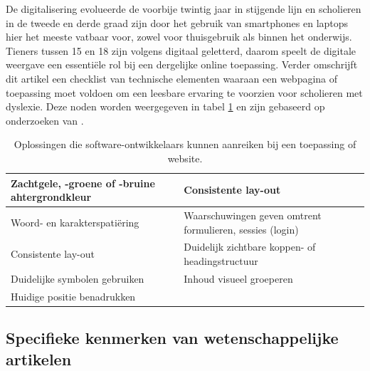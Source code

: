 \medspace


De digitalisering evolueerde de voorbije twintig jaar in stijgende lijn en scholieren in de tweede en derde graad zijn door het gebruik van smartphones en laptops hier het meeste vatbaar voor, zowel voor thuisgebruik als binnen het onderwijs. Tieners tussen 15 en 18 zijn volgens \textcite{Harvard2023} digitaal geletterd, daarom speelt de digitale weergave een essentiële rol bij een dergelijke online toepassing. Verder omschrijft dit artikel een checklist van technische elementen waaraan een webpagina of toepassing moet voldoen om een leesbare ervaring te voorzien voor scholieren met dyslexie. Deze noden worden weergegeven in tabel \ref{table:dyslexia-necessaries} en zijn gebaseerd op onderzoeken van \textcite{Santana2012, Harvard2023}.

\begin{center}
		\begin{table}[H]
	\begin{tabular}{ | m{8cm} | m{8cm} | } 
		\hline
		Zachtgele, -groene of -bruine ahtergrondkleur & Consistente lay-out \\
		\hline
		Woord- en karakterspatiëring & Waarschuwingen geven omtrent formulieren, sessies (login) \\ 
		\hline
		Consistente lay-out & Duidelijk zichtbare koppen- of headingstructuur \\ 
		\hline
		Duidelijke symbolen gebruiken &  Inhoud visueel groeperen \\
		\hline
		Huidige positie benadrukken &  \\
		\hline
	\end{tabular}
	\caption{Oplossingen die software-ontwikkelaars kunnen aanreiken bij een toepassing of website.}
	\label{table:dyslexia-necessaries}
	\end{table}
\end{center}

\subsection{Specifieke kenmerken van wetenschappelijke artikelen}

